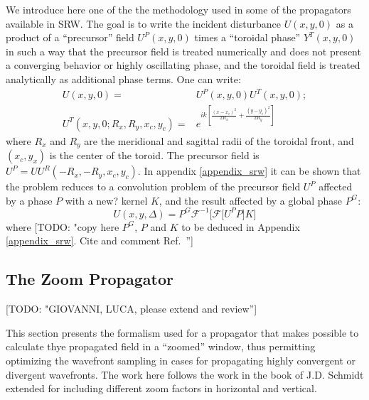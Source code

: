 \documentclass{iucr}              %
\newcommand{\todo}[1]{{\color{red}[TODO: "#1'']}}
\newcommand{\inred}[1]{{\color{red}#1}}
\begin{document}
We introduce here one of the the methodology used in some of the propagators available in SRW. The goal is to write the incident disturbance $U(x,y,0)$ as a product of a ``precursor'' field $U^P(x,y,0)$ times a ``toroidal phase'' $Y^T(x,y,0)$ in such a way that the precursor field is treated numerically and does not present a converging behavior or highly oscillating phase, and the toroidal field is treated analytically as additional phase terms. One can write: 
\begin{equation}
\begin{aligned}
U(x,y,0) =& U^P(x,y,0) U^T(x,y,0); \\
U^T(x,y,0;R_x,R_y,x_c,y_c) =& e^{ik [\frac{(x-x_c)^2}{2 R_x} + \frac{(y-y_c)^2}{2 R_y}]}
\end{aligned}
\end{equation}
where $R_x$ and $R_y$ are the meridional and sagittal radii of the toroidal front, and $(x_c,y_x)$ is the center of the toroid. The precursor field is $U^P=U U^R(-R_x,-R_y,x_c,y_c)$. 
In appendix \ref{appendix_srw} it can be shown that the problem reduces to a convolution problem of the precursor field $U^P$ affected by a phase $P$ with a \inred{new?} kernel $K$, and the result affected by a global phase $P^G$: 
\begin{equation}
\label{eq: srw in convolution form}
U(x, y, \Delta) = P^G \mathcal{F}^{-1}\Big[\mathcal{F}\big[U^P P \big] K \Big]
\end{equation}
where \todo{copy here $P^G$, $P$ and $K$ to be deduced in Appendix \ref{appendix_srw}. Cite and comment Ref.~\cite{wyrowski}}


\subsection{The Zoom Propagator}

\todo{GIOVANNI, LUCA, please extend and review}

This section presents the formalism used for a propagator that makes possible to calculate thye propagated field in a ``zoomed'' window, thus permitting optimizing the wavefront sampling in cases for propagating highly convergent or divergent wavefronts. The work here follows the work in the book of J.D. Schmidt \cite{schmidt} extended for including different zoom factors in horizontal and vertical. 
\end{document}

